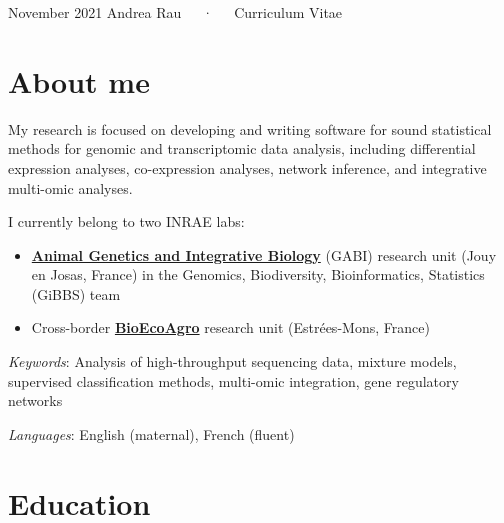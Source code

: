 \documentclass[11pt, a4paper]{awesome-cv}
\providecommand{\tightlist}{%
	\setlength{\itemsep}{0pt}\setlength{\parskip}{0pt}}
\begin{document}
\makecvheader

\makecvfooter
  {November 2021}
    {Andrea Rau~~~·~~~Curriculum Vitae}
  {\thepage}





\hypertarget{about-me}{%
\section{About me}\label{about-me}}

My research is focused on developing and writing software for sound
statistical methods for genomic and transcriptomic data analysis,
including differential expression analyses, co-expression analyses,
network inference, and integrative multi-omic analyses.

I currently belong to two INRAE labs:

\begin{itemize}
\tightlist
\item
  \href{https://www6.jouy.inra.fr/gabi_eng/}{\textbf{Animal Genetics and
  Integrative Biology}} (GABI) research unit (Jouy en Josas, France) in
  the Genomics, Biodiversity, Bioinformatics, Statistics (GiBBS) team\\
\item
  Cross-border \href{https://www.bioecoagro.eu/}{\textbf{BioEcoAgro}}
  research unit (Estrées-Mons, France)
\end{itemize}

\emph{Keywords}: Analysis of high-throughput sequencing data, mixture
models, supervised classification methods, multi-omic integration, gene
regulatory networks

\emph{Languages}: English (maternal), French (fluent)

\hypertarget{education}{%
\section{Education}\label{education}}
\end{document}
